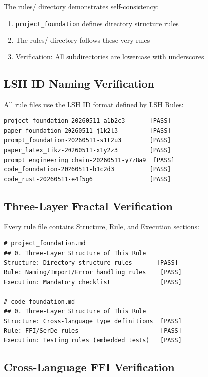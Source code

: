 \documentclass{article}
\begin{document}
The rules/ directory demonstrates self-consistency:

\begin{enumerate}
    \item \texttt{project\_foundation} defines directory structure rules
    \item The rules/ directory follows these very rules
    \item Verification: All subdirectories are lowercase with underscores
\end{enumerate}

\subsection{LSH ID Naming Verification}

All rule files use the LSH ID format defined by LSH Rules:

\begin{lstlisting}[caption={LSH ID naming verification}]
project_foundation-20260511-a1b2c3       [PASS]
paper_foundation-20260511-j1k2l3         [PASS]
prompt_foundation-20260511-s1t2u3        [PASS]
paper_latex_tikz-20260511-x1y2z3         [PASS]
prompt_engineering_chain-20260511-y7z8a9  [PASS]
code_foundation-20260511-b1c2d3          [PASS]
code_rust-20260511-e4f5g6                [PASS]
\end{lstlisting}

\subsection{Three-Layer Fractal Verification}

Every rule file contains Structure, Rule, and Execution sections:

\begin{lstlisting}[caption={Fractal verification}]
# project_foundation.md
## 0. Three-Layer Structure of This Rule
Structure: Directory structure rules       [PASS]
Rule: Naming/Import/Error handling rules    [PASS]
Execution: Mandatory checklist              [PASS]

# code_foundation.md
## 0. Three-Layer Structure of This Rule
Structure: Cross-language type definitions  [PASS]
Rule: FFI/SerDe rules                       [PASS]
Execution: Testing rules (embedded tests)   [PASS]
\end{lstlisting}

\subsection{Cross-Language FFI Verification}
\end{document}
